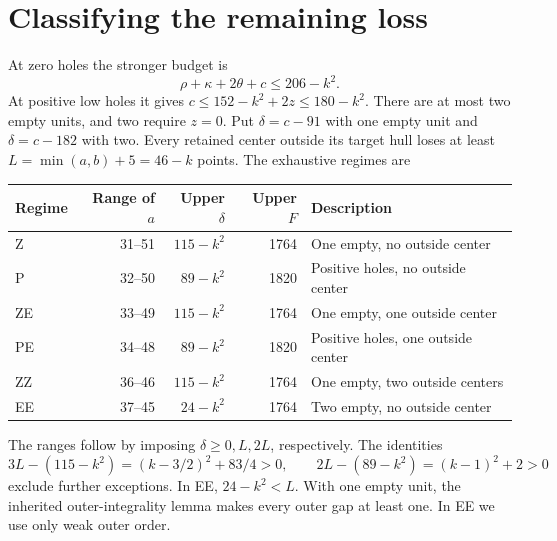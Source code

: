 \documentclass[11pt,a4paper]{article}
\begin{document}
\section{Classifying the remaining loss}
At zero holes the stronger budget is
\begin{equation}\label{eq:zero}
 \rho+\kappa+2\theta+c\le206-k^2.
\end{equation}
At positive low holes it gives $c\le152-k^2+2z\le180-k^2$.
There are at most two empty units, and two require $z=0$.
Put $\delta=c-91$ with one empty unit and $\delta=c-182$ with two.
Every retained center outside its target hull loses at least
$L=\min(a,b)+5=46-k$ points. The exhaustive regimes are
\begin{center}\small
\begin{tabular}{lrrrl}
\toprule
Regime&Range of $a$&Upper $\delta$&Upper $F$&Description\\
\midrule
Z&31--51&$115-k^2$&1764&One empty, no outside center\\
P&32--50&$89-k^2$&1820&Positive holes, no outside center\\
ZE&33--49&$115-k^2$&1764&One empty, one outside center\\
PE&34--48&$89-k^2$&1820&Positive holes, one outside center\\
ZZ&36--46&$115-k^2$&1764&One empty, two outside centers\\
EE&37--45&$24-k^2$&1764&Two empty, no outside center\\
\bottomrule
\end{tabular}
\end{center}
The ranges follow by imposing $\delta\ge0,L,2L$, respectively.
The identities
\[
 3L-(115-k^2)=(k-3/2)^2+83/4>0,\qquad
 2L-(89-k^2)=(k-1)^2+2>0
\]
exclude further exceptions. In EE, $24-k^2<L$.
With one empty unit, the inherited outer-integrality lemma makes every
outer gap at least one. In EE we use only weak outer order.
\end{document}
